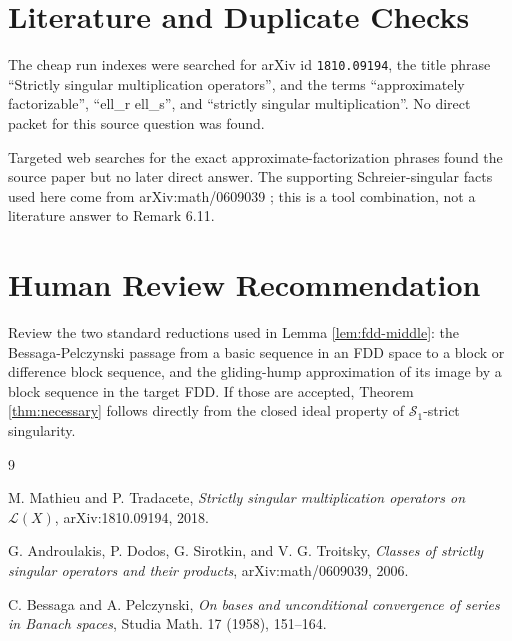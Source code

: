 \documentclass[11pt]{article}
\begin{document}
\section*{Literature and Duplicate Checks}

The cheap run indexes were searched for arXiv id \texttt{1810.09194}, the
title phrase ``Strictly singular multiplication operators'', and the terms
``approximately factorizable'', ``ell\_r ell\_s'', and ``strictly singular
multiplication''.  No direct packet for this source question was found.

Targeted web searches for the exact approximate-factorization phrases found
the source paper but no later direct answer.  The supporting Schreier-singular
facts used here come from arXiv:math/0609039 \cite{ADST}; this is a tool
combination, not a literature answer to Remark 6.11.

\section*{Human Review Recommendation}

Review the two standard reductions used in Lemma \ref{lem:fdd-middle}: the
Bessaga-Pelczynski passage from a basic sequence in an FDD space to a block or
difference block sequence, and the gliding-hump approximation of its image by
a block sequence in the target FDD.  If those are accepted, Theorem
\ref{thm:necessary} follows directly from the closed ideal property of
$\mathcal S_1$-strict singularity.

\begin{thebibliography}{9}

M. Mathieu and P. Tradacete,
\emph{Strictly singular multiplication operators on $\mathcal L(X)$},
arXiv:1810.09194, 2018.

G. Androulakis, P. Dodos, G. Sirotkin, and V. G. Troitsky,
\emph{Classes of strictly singular operators and their products},
arXiv:math/0609039, 2006.

C. Bessaga and A. Pelczynski,
\emph{On bases and unconditional convergence of series in Banach spaces},
Studia Math. 17 (1958), 151--164.

\end{thebibliography}
\end{document}
